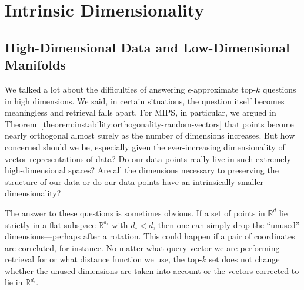 \chapter{Intrinsic Dimensionality}
\label{chapter:intrinsic-dimensionality}


\section{High-Dimensional Data and Low-Dimensional Manifolds}

We talked a lot about the difficulties of answering $\epsilon$-approximate top-$k$
questions in high dimensions. We said, in certain situations,
the question itself becomes meaningless and
retrieval falls apart. For MIPS, in particular,
we argued in Theorem~\ref{theorem:instability:orthogonality-random-vectors}
that points become nearly orthogonal almost surely
as the number of dimensions increases. But how concerned should we
be, especially given the ever-increasing dimensionality of
vector representations of data? Do our data points really
live in such extremely high-dimensional spaces? Are all the dimensions
necessary to preserving the structure of our data or do our data points
have an intrinsically smaller dimensionality?

The answer to these questions is sometimes obvious.
If a set of points in $\mathbb{R}^d$ lie strictly in a flat subspace 
$\mathbb{R}^{d_\circ}$ with $d_\circ < d$, then one can simply drop
the ``unused'' dimensions---perhaps after a rotation.
This could happen if a pair of coordinates are correlated, for instance.
No matter what query vector we are performing retrieval
for or what distance function we use, the top-$k$ set does not change
whether the unused dimensions are taken into account or the vectors
corrected to lie in $\mathbb{R}^{d_\circ}$.

